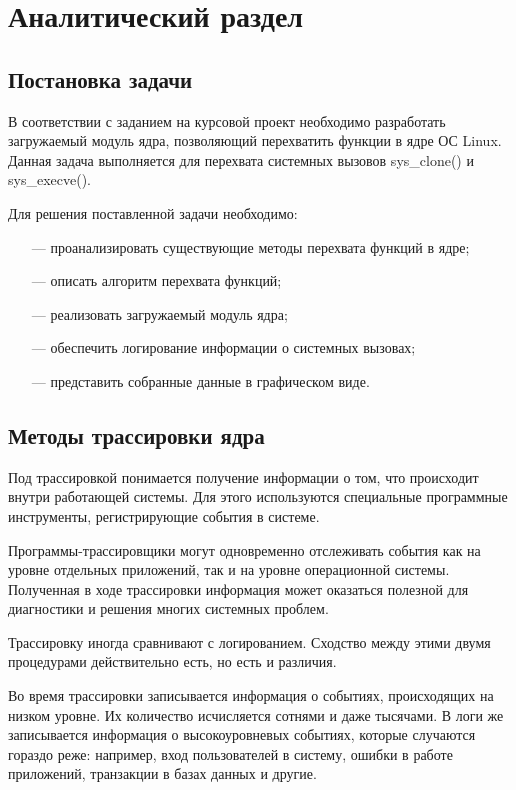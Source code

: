 \section{Аналитический раздел}

\subsection{Постановка задачи}

В соответствии с заданием на курсовой проект необходимо разработать загружаемый модуль ядра, позволяющий перехватить функции в ядре ОС Linux.
Данная задача выполняется для перехвата системных вызовов sys\_clone() и\\ sys\_execve().

Для решения поставленной задачи необходимо:

\begin{itemize}[leftmargin=0.7cm +  - ]
	\item[---] проанализировать существующие методы перехвата функций в ядре;
	\item[---] описать алгоритм перехвата функций;
	\item[---] реализовать загружаемый модуль ядра;
	\item[---] обеспечить логирование информации о системных вызовах;
	\item[---] представить собранные данные в графическом виде.
\end{itemize}

\subsection{Методы трассировки ядра}

Под трассировкой \cite{ftrace} понимается получение информации о том, что происходит внутри работающей системы. Для этого используются специальные программные инструменты, регистрирующие события в системе.

Программы-трассировщики могут одновременно отслеживать события как на уровне отдельных приложений, так и на уровне операционной системы. Полученная в ходе трассировки информация может оказаться полезной для диагностики и решения многих системных проблем.

Трассировку иногда сравнивают с логированием. Сходство между этими двумя процедурами действительно есть, но есть и различия.

Во время трассировки записывается информация о событиях, происходящих на низком уровне. Их количество исчисляется сотнями и даже тысячами. В логи же записывается информация о высокоуровневых событиях, которые случаются гораздо реже: например, вход пользователей в систему, ошибки в работе приложений, транзакции в базах данных и другие.

